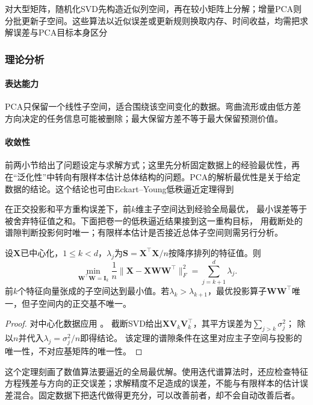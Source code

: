 对大型矩阵，随机化SVD先构造近似列空间，再在较小矩阵上分解；增量PCA则分批更新子空间。这些算法以近似误差或更新规则换取内存、时间收益，均需把求解误差与PCA目标本身区分

\subsubsection{理论分析}
\label{sec:dim-pca-theory}

\paragraph{表达能力}
PCA只保留一个线性子空间，适合围绕该空间变化的数据。弯曲流形或由低方差方向决定的任务信息可能被删除；最大保留方差不等于最大保留预测价值。

\paragraph{收敛性}

前两小节给出了问题设定与求解方式；这里先分析固定数据上的经验最优性，再在“泛化性”中转向有限样本估计总体结构的问题。PCA的解析最优性是关于给定数据的结论。这个结论也可由Eckart--Young低秩逼近定理得到

在正交投影和平方重构误差下，前$k$维主子空间达到经验全局最优，
最小误差等于被舍弃特征值之和。下面把卷一的低秩逼近结果接到这一重构目标，
用截断处的谱隙判断投影何时唯一；有限样本估计是否接近总体子空间则需另行分析。

\begin{theorem}[PCA的最优线性重构性质]
  \label{thm:dim-pca-optimal}
  设$\bm{X}$已中心化，$1\leq k<d$，$\lambda_j$为$\bm{S}=\bm{X}^{\top}\bm{X}/n$按降序排列的特征值。则
  \[
    \min_{\bm{W}^{\top}\bm{W}=\bm{I}_k}
       \frac1n\lVert\bm{X}-\bm{X}\bm{W}\bm{W}^{\top}\rVert_F^2
       =\sum_{j=k+1}^{d}\lambda_j.
  \]
  前$k$个特征向量张成的子空间达到最小值。若$\lambda_k>\lambda_{k+1}$，最优投影算子$\bm{W}\bm{W}^{\top}$唯一，但子空间内的正交基不唯一。
\end{theorem}

\begin{proof}
对中心化数据应用
。
截断SVD给出$\bm X\bm V_k\bm V_k^\top$，其平方误差为$\sum_{j>k}\sigma_j^2$；
除以$n$并代入$\lambda_j=\sigma_j^2/n$即得结论。
该定理的谱隙条件在这里对应主子空间与投影的唯一性，不对应基矩阵的唯一性。
\end{proof}

这个定理刻画了数值算法要逼近的全局最优解。使用迭代谱算法时，还应检查特征方程残差与方向的正交误差；求解精度不足造成的误差，不能与有限样本的估计误差混合。固定数据下把迭代做得更充分，可以改善前者，却不会自动改善后者。

